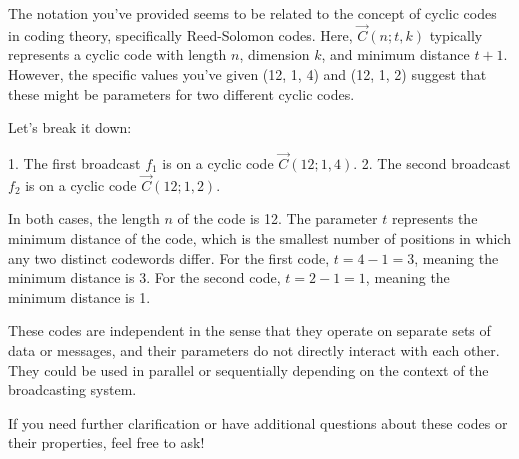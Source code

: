 The notation you've provided seems to be related to the concept of cyclic codes in coding theory, specifically Reed-Solomon codes. Here, \(\overrightarrow{C}(n; t, k)\) typically represents a cyclic code with length \(n\), dimension \(k\), and minimum distance \(t+1\). However, the specific values you've given (12, 1, 4) and (12, 1, 2) suggest that these might be parameters for two different cyclic codes.

Let's break it down:

1. The first broadcast \(f_1\) is on a cyclic code \(\overrightarrow{C}(12; 1, 4)\).
2. The second broadcast \(f_2\) is on a cyclic code \(\overrightarrow{C}(12; 1, 2)\).

In both cases, the length \(n\) of the code is 12. The parameter \(t\) represents the minimum distance of the code, which is the smallest number of positions in which any two distinct codewords differ. For the first code, \(t = 4 - 1 = 3\), meaning the minimum distance is 3. For the second code, \(t = 2 - 1 = 1\), meaning the minimum distance is 1.

These codes are independent in the sense that they operate on separate sets of data or messages, and their parameters do not directly interact with each other. They could be used in parallel or sequentially depending on the context of the broadcasting system.

If you need further clarification or have additional questions about these codes or their properties, feel free to ask!